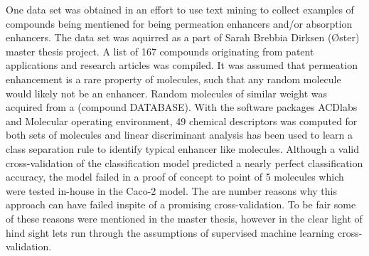 One data set was obtained in an effort to use text mining to collect examples of compounds being mentiened for being permeation enhancers and/or absorption enhancers. The data set was aquirred as a part of Sarah Brebbia Dirksen (Øster) master thesis project. A list of 167 compounds originating from patent applications and research articles was compiled. It was assumed that permeation enhancement is a rare property of molecules, such that any random molecule would likely not be an enhancer. Random molecules of similar weight was acquired from a (compound DATABASE). With the software packages ACDlabs and Molecular operating environment, 49 chemical descriptors was computed for both sets of molecules and linear discriminant analysis has been used to learn a class separation rule to identify typical enhancer like molecules. Although a valid cross-validation of the classification model predicted a nearly perfect classification accuracy, the model failed in a proof of concept to point of 5 molecules which were tested in-house in the Caco-2 model. The are number reasons why this approach can have failed inspite of a promising cross-validation. To be fair some of these reasons were mentioned in the master thesis, however in the clear light of hind sight lets run through the assumptions of supervised machine learning cross-validation. \cite{sara2012application}


